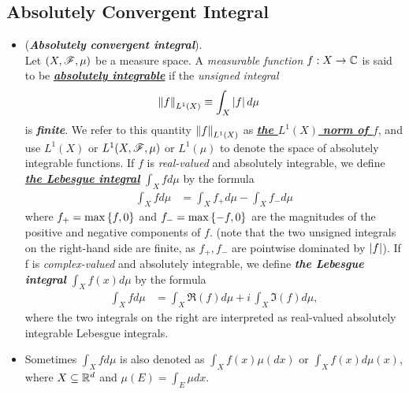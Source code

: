 \documentclass[11pt]{article}
\begin{document}
\subsection{Absolutely Convergent Integral}
\begin{itemize}
\item \begin{definition} (\emph{\textbf{Absolutely convergent integral}}). \\
Let $(X,{\mathscr F}, \mu)$ be a measure space. A \emph{measurable function} $f : X \rightarrow {\mathbb C}$ is said to be \underline{\emph{\textbf{absolutely integrable}}} if the \emph{unsigned integral} 
\begin{align*}
\left\|f\right\|_{L^{1}(X)} &\equiv \int_{X}\left\lvert f \right\rvert d\mu 
\end{align*}
is \emph{\textbf{finite}}. We refer to this quantity $\left\|f\right\|_{L^{1}(X)}$ as \underline{\emph{\textbf{the $L^1(X)$ norm of $f$}}}, and use $L^1(X)$ or $L^1(X, {\mathscr F}, \mu)$ or $L^1(\mu)$ to denote the space of absolutely integrable functions. If $f$ is \emph{real-valued} and absolutely integrable, we define \underline{\emph{\textbf{the Lebesgue integral}}} $\int_{X}f d\mu$ by the formula
\begin{align*}
\int_{X}f d\mu &= \int_{X}f_{+}d\mu - \int_{X}f_{-}d\mu
\end{align*}
where $f_{+} = \max\left\{f, 0\right\}$ and $f_{-} = \max\left\{-f, 0\right\}$ are the magnitudes of the positive and negative components of $f$. (note that the two unsigned integrals on the right-hand side are finite, as $f_+, f_{-}$ are pointwise dominated by $\left\lvert f \right\rvert$). If f is \emph{complex-valued} and absolutely integrable, we define \emph{\textbf{the Lebesgue integral}} $\int_{X}f(x)d\mu$ by the formula
\begin{align*}
\int_{X}f d\mu &= \int_{X}\Re( f ) d\mu  + i\,\int_{X}\Im(f) d\mu,
\end{align*}
where the two integrals on the right are interpreted as real-valued absolutely integrable Lebesgue integrals.
\end{definition}

\item \begin{remark}
 Sometimes $\int_{X}f d\mu $ is also denoted as $\int_{X}f(x) \mu(dx) $ or $\int_{X}f(x) d\mu(x)$, where $X\subseteq {\mathbb R}^{d}$ and $\mu(E) = \int_{E}\mu dx$.
\end{remark}


\end{itemize}
\end{document}
